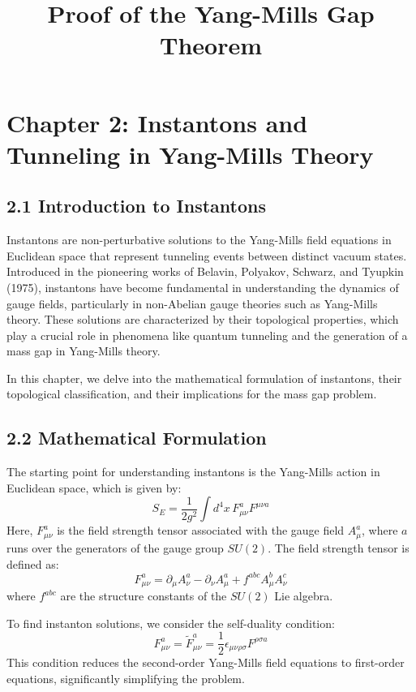 \documentclass{article}
\title{Proof of the Yang-Mills Gap Theorem}
\author{}
\date{}
\begin{document}
\maketitle

\section*{Chapter 2: Instantons and Tunneling in Yang-Mills Theory}

\subsection*{2.1 Introduction to Instantons}
Instantons are non-perturbative solutions to the Yang-Mills field equations in Euclidean space that represent tunneling events between distinct vacuum states. Introduced in the pioneering works of Belavin, Polyakov, Schwarz, and Tyupkin (1975), instantons have become fundamental in understanding the dynamics of gauge fields, particularly in non-Abelian gauge theories such as Yang-Mills theory. These solutions are characterized by their topological properties, which play a crucial role in phenomena like quantum tunneling and the generation of a mass gap in Yang-Mills theory.

In this chapter, we delve into the mathematical formulation of instantons, their topological classification, and their implications for the mass gap problem.

\subsection*{2.2 Mathematical Formulation}
The starting point for understanding instantons is the Yang-Mills action in Euclidean space, which is given by:
\[
S_E = \frac{1}{2g^2} \int d^4x \, F_{\mu\nu}^a F^{\mu\nu a}
\]
Here, \( F_{\mu\nu}^a \) is the field strength tensor associated with the gauge field \( A_\mu^a \), where \( a \) runs over the generators of the gauge group \( SU(2) \). The field strength tensor is defined as:
\[
F_{\mu\nu}^a = \partial_\mu A_\nu^a - \partial_\nu A_\mu^a + f^{abc} A_\mu^b A_\nu^c
\]
where \( f^{abc} \) are the structure constants of the \( SU(2) \) Lie algebra.

To find instanton solutions, we consider the self-duality condition:
\[
F_{\mu\nu}^a = \tilde{F}_{\mu\nu}^a = \frac{1}{2} \epsilon_{\mu\nu\rho\sigma} F^{\rho\sigma a}
\]
This condition reduces the second-order Yang-Mills field equations to first-order equations, significantly simplifying the problem.
\end{document}
